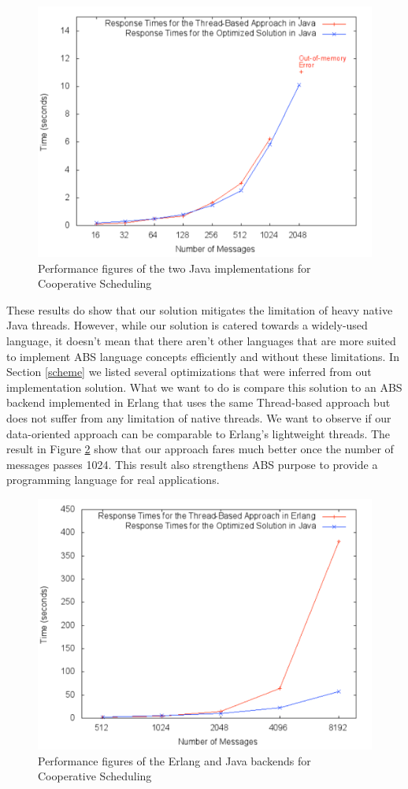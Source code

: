\begin{figure}
	\label{bench:jj}
	\centering
	\includegraphics[scale=0.8]{jaj8}
	\caption{Performance figures of the two Java implementations for Cooperative Scheduling}
\end{figure}

\par These results do show that our solution mitigates the limitation of heavy native Java threads. However, while our solution is catered towards a widely-used language, it doesn't mean that there aren't other languages that are more suited to implement ABS language concepts efficiently and without these limitations. In Section \ref{scheme} we listed several optimizations that were inferred from out implementation solution. What we want to do is compare this solution to an ABS backend implemented in Erlang that uses the same Thread-based approach but does not suffer from any limitation of native threads. We want to observe if our data-oriented approach can be comparable to Erlang's lightweight threads. The result in Figure \ref{bench:ej} show that our approach fares much better once the number of messages passes 1024. This result also strengthens ABS purpose to provide a programming language for real applications.

\begin{figure}
	\label{bench:ej}
	\centering
	\includegraphics[scale=0.8]{erlj8}
	\caption{Performance figures of the Erlang and Java backends for Cooperative Scheduling}
\end{figure}



